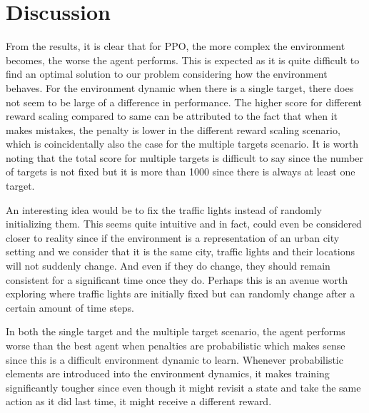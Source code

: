 \documentclass{article}
\begin{document}
\section{Discussion}
\label{discussion}
From the results, it is clear that for PPO, the more complex the environment becomes, the worse the agent performs. This is expected as it is quite difficult to find an optimal solution to our problem considering how the environment behaves. For the environment dynamic when there is a single target, there does not seem to be large of a difference in performance. The higher score for different reward scaling compared to same can be attributed to the fact that when it makes mistakes, the penalty is lower in the different reward scaling scenario, which is coincidentally also the case for the multiple targets scenario. It is worth noting that the total score for multiple targets is difficult to say since the number of targets is not fixed but it is more than 1000 since there is always at least one target.

An interesting idea would be to fix the traffic lights instead of randomly initializing them. This seems quite intuitive and in fact, could even be considered closer to reality since if the environment is a representation of an urban city setting and we consider that it is the same city, traffic lights and their locations will not suddenly change. And even if they do change, they should remain consistent for a significant time once they do. Perhaps this is an avenue worth exploring where traffic lights are initially fixed but can randomly change after a certain amount of time steps. 

In both the single target and the multiple target scenario, the agent performs worse than the best agent when penalties are probabilistic which makes sense since this is a difficult environment dynamic to learn. Whenever probabilistic elements are introduced into the environment dynamics, it makes training significantly tougher since even though it might revisit a state and take the same action as it did last time, it might receive a different reward.
\end{document}
